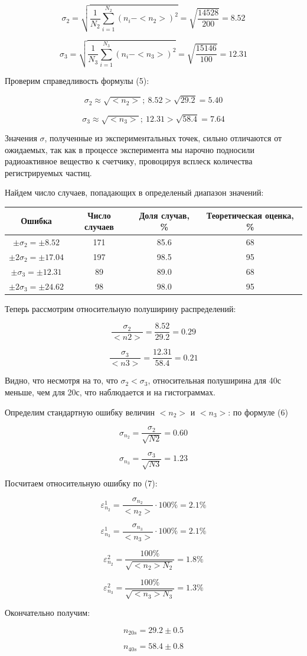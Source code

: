 \documentclass[14pt]{article}
\begin{document}
$$\sigma_2 = \sqrt{\frac{1}{N_2} \sum_{i = 1}^{N_2} (n_i - <n_2>)^2} = \sqrt{\frac{14528}{200}} = 8.52$$

$$\sigma_3 = \sqrt{\frac{1}{N_3} \sum_{i = 1}^{N_3} (n_i - <n_3>)^2} = \sqrt{\frac{15146}{100}} = 12.31$$

Проверим справедливость формулы (5):


$$\sigma_2 \approx \sqrt{<n_2>}; ~ 8.52  > \sqrt{29.2} = 5.40$$

$$\sigma_3 \approx \sqrt{<n_3>}; ~ 12.31 > \sqrt{58.4} = 7.64$$

Значения $\sigma$, полученные из экспериментальных точек, сильно отличаются от ожидаемых, так как в процессе эксперимента мы нарочно подносили радиоактивное вещество к счетчику, провоцируя всплеск количества регистрируемых частиц.

Найдем число случаев, попадающих в определеный диапазон значений:

\begin{center}
\begin{tabular}{|c|c|c|c|}
\hline
Ошибка							&	Число случаев	&	Доля случав, \%		&	Теоретическая оценка, \%	\\
\hline
$\pm\sigma_2 = \pm 8.52$		&	171				&	85.6				&	68							\\
\hline
$\pm 2\sigma_2 = \pm 17.04$		&	197				&	98.5				&	95							\\
\hline
$\pm\sigma_3 = \pm 12.31$		&	89				&	89.0				&	68							\\
\hline
$\pm 2\sigma_3 = \pm 24.62$		&	98				&	98.0				&	95							\\
\hline
\end{tabular}
\end{center}


Теперь рассмотрим относительную полуширину распределений:

$$\frac{\sigma_2}{<n2>} = \frac{8.52}{29.2}  = 0.29$$

$$\frac{\sigma_3}{<n3>} = \frac{12.31}{58.4} = 0.21$$

Видно, что несмотря на то, что $\sigma_2 < \sigma_3$, относительная полуширина для 40с меньше, чем для 20с, что наблюдается и на гистограммах.

Определим стандартную ошибку величин $<n_2>$ и $<n_3>$: по формуле (6)

$$\sigma_{n_2} = \frac{\sigma_2}{\sqrt{N2}} = 0.60$$

$$\sigma_{n_3} = \frac{\sigma_3}{\sqrt{N3}} = 1.23$$

Посчитаем относительную ошибку по (7):

$$\varepsilon_{n_2}^1 = \frac{\sigma_{n_2}}{<n_2>} \cdot 100\% = 2.1\%$$

$$\varepsilon_{n_3}^1 = \frac{\sigma_{n_3}}{<n_3>} \cdot 100\% = 2.1\%$$

$$\varepsilon_{n_2}^2 = \frac{100\%}{\sqrt{<n_2>N_2}} = 1.8\%$$

$$\varepsilon_{n_3}^2 = \frac{100\%}{\sqrt{<n_3>N_3}} = 1.3\%$$

\vspace{1cm}
Окончательно получим:

$$n_{20s} = 29.2 \pm 0.5$$

$$n_{40s} = 58.4 \pm 0.8$$
\end{document}
